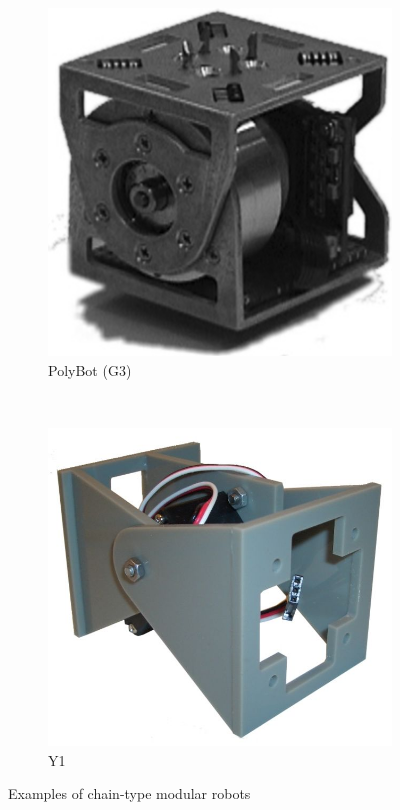 \begin{figure}[b]
\begin{subfigure}[b]{0.18\textwidth}
                \includegraphics[width=\textwidth]{images/PolyBot_G3.png}
                \caption{PolyBot (G3)}
                \label{fig:PolyBot}
        \end{subfigure}
        ~
        \begin{subfigure}[b]{0.28\textwidth}
         	   \centering
                \includegraphics[width=\textwidth]{images/Y1_01.jpg}
                \caption{Y1}
                \label{fig:Y1}
        \end{subfigure}
        \caption{Examples of chain-type modular robots}\label{fig:config_chain_examples}
\end{figure}

